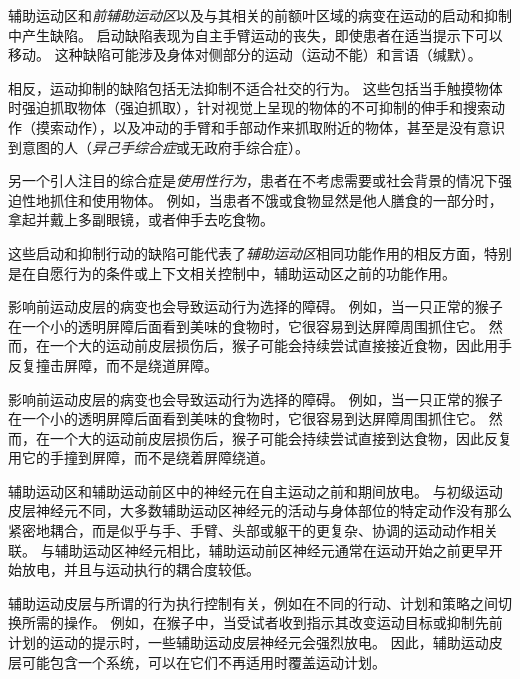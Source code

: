 \begin{proposition} \label{box:34_2}
	
	\quad \quad 辅助运动区和\textit{前辅助运动区}以及与其相关的前额叶区域的病变在运动的启动和抑制中产生缺陷。
	启动缺陷表现为自主手臂运动的丧失，即使患者在适当提示下可以移动。
	这种缺陷可能涉及身体对侧部分的运动（运动不能）和言语（缄默）。
	
	\quad \quad 相反，运动抑制的缺陷包括无法抑制不适合社交的行为。
	这些包括当手触摸物体时强迫抓取物体（强迫抓取），针对视觉上呈现的物体的不可抑制的伸手和搜索动作（摸索动作），以及冲动的手臂和手部动作来抓取附近的物体，甚至是没有意识到意图的人（\textit{异己手综合症}或无政府手综合症）。
	
	\quad \quad 另一个引人注目的综合症是\textit{使用性行为}，患者在不考虑需要或社会背景的情况下强迫性地抓住和使用物体。
	例如，当患者不饿或食物显然是他人膳食的一部分时，拿起并戴上多副眼镜，或者伸手去吃食物。
	
	\quad \quad 这些启动和抑制行动的缺陷可能代表了\textit{辅助运动区}相同功能作用的相反方面，特别是在自愿行为的条件或上下文相关控制中，辅助运动区之前的功能作用。
	
	\quad \quad 影响前运动皮层的病变也会导致运动行为选择的障碍。
	例如，当一只正常的猴子在一个小的透明屏障后面看到美味的食物时，它很容易到达屏障周围抓住它。
	然而，在一个大的运动前皮层损伤后，猴子可能会持续尝试直接接近食物，因此用手反复撞击屏障，而不是绕道屏障。
	
	\quad \quad 影响前运动皮层的病变也会导致运动行为选择的障碍。
	例如，当一只正常的猴子在一个小的透明屏障后面看到美味的食物时，它很容易到达屏障周围抓住它。
	然而，在一个大的运动前皮层损伤后，猴子可能会持续尝试直接到达食物，因此反复用它的手撞到屏障，而不是绕着屏障绕道。
	
\end{proposition}


辅助运动区和辅助运动前区中的神经元在自主运动之前和期间放电。
与初级运动皮层神经元不同，大多数辅助运动区神经元的活动与身体部位的特定动作没有那么紧密地耦合，而是似乎与手、手臂、头部或躯干的更复杂、协调的运动动作相关联。
与辅助运动区神经元相比，辅助运动前区神经元通常在运动开始之前更早开始放电，并且与运动执行的耦合度较低。


辅助运动皮层与所谓的行为执行控制有关，例如在不同的行动、计划和策略之间切换所需的操作。
例如，在猴子中，当受试者收到指示其改变运动目标或抑制先前计划的运动的提示时，一些辅助运动皮层神经元会强烈放电。
因此，辅助运动皮层可能包含一个系统，可以在它们不再适用时覆盖运动计划。


